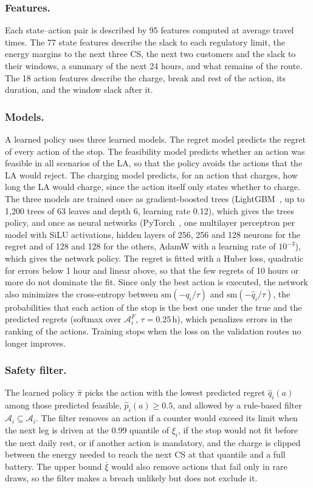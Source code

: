\documentclass[runningheads]{llncs}
\begin{document}
\subsubsection{Features.}
Each state--action pair is described by 95 features computed at average travel
times. The 77 state features describe the slack to each regulatory limit, the
energy margins
to the next three CS, the next two customers and the slack to their windows, a
summary of the next 24 hours, and what remains of the route. The 18 action
features describe the charge, break and rest of the action, its duration, and
the window slack after it.

\subsubsection{Models.}
A learned policy uses three learned models. The regret model predicts the
regret of every action of the stop. The feasibility model predicts whether an
action was feasible in all scenarios of the LA, so that the policy avoids the
actions that the LA would reject. The charging model predicts, for an action
that charges, how long the LA would charge, since the action itself only
states whether to charge. The three models are trained once as gradient-boosted
trees (LightGBM~\cite{ke2017}, up to 1{,}200 trees of 63 leaves and depth 6,
learning rate 0.12), which gives the trees policy, and once as neural networks
(PyTorch~\cite{paszke2019}, one multilayer perceptron per model with SiLU
activations, hidden layers of 256, 256 and 128 neurons for the regret and of
128 and 128 for the others, AdamW with a learning rate of $10^{-3}$), which
gives the network policy. The regret is fitted with a Huber loss, quadratic
for errors below 1 hour and linear above, so that the few regrets of 10 hours
or more do not dominate the fit. Since only the best action is executed, the
network also minimizes the cross-entropy between $\mathrm{sm}(-q_i/\tau)$ and
$\mathrm{sm}(-\hat q_i/\tau)$, the probabilities that each action of the stop
is the best one under the true and the predicted regrets (softmax over
$\mathcal{A}^F_i$, $\tau=0.25$\,h), which penalizes errors in the ranking of
the actions. Training stops when the loss on the validation routes no longer
improves.

\subsubsection{Safety filter.}
The learned policy $\hat\pi$ picks the action with the lowest predicted regret
$\hat q_i(a)$ among those predicted feasible, $\hat p_i(a)\ge0.5$, and allowed
by a rule-based filter $\hat{\mathcal{A}}_i\subseteq\mathcal{A}_i$. The filter removes an action if a counter would exceed its limit
when the next leg is driven at the 0.99 quantile of $\xi_i$, if the stop would
not fit before the next daily rest, or if another action is mandatory, and the
charge is clipped between the energy needed to reach the next CS at that
quantile and a full battery. The upper bound $\overline{\xi}$ would also
remove actions that fail only in rare draws, so the filter makes a breach
unlikely but does not exclude it.
\end{document}
